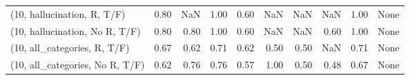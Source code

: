 \begin{table*}[h!]
\begin{adjustbox}{width=2\columnwidth,center}
\begin{tabular}{lrrr|rrr|rrr}
(10, hallucination, R, T/F)           &                      0.80 &                   NaN &                      1.00 &                          0.60 &                       NaN &                           NaN &                                    NaN &                               1.00 &                                  None \\
(10, hallucination, No R, T/F)        &                      0.80 &                  0.80 &                      1.00 &                          0.60 &                       NaN &                           NaN &                                   0.60 &                               1.00 &                                  None \\
(10, all\_categories, R, T/F)          &                      0.67 &                  0.62 &                      0.71 &                          0.62 &                      0.50 &                          0.50 &                                    NaN &                               0.71 &                                  None \\
(10, all\_categories, No R, T/F)       &                      0.62 &                  0.76 &                      0.76 &                          0.57 &                      1.00 &                          0.50 &                                   0.48 &                               0.67 &                                  None \\




\end{tabular}
\end{adjustbox}
\end{table*}
